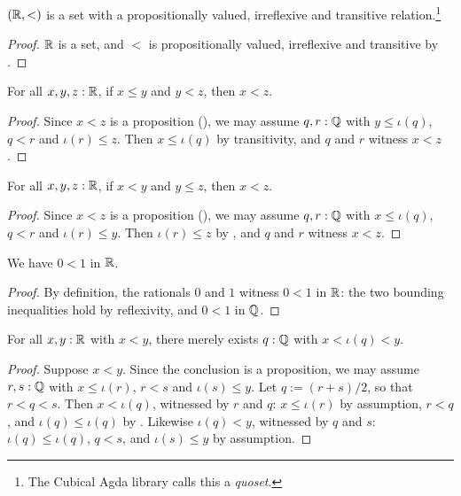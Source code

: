 \begin{corollary}
  \label{RLtQuoset}
  $(\mathbb{R}, <)$ is a set with a propositionally valued, irreflexive and transitive relation.\footnote{The Cubical Agda library calls this a \emph{quoset}.}
\end{corollary}
\begin{proof}
  $\mathbb{R}$ is a set, and $<$ is propositionally valued, irreflexive and transitive by .
\end{proof}

\begin{lemma}
  \label{isTransLeLtReal}
  For all $x, y, z : \mathbb{R}$, if $x \le y$ and $y < z$, then $x < z$.
\end{lemma}
\begin{proof}
  Since $x < z$ is a proposition (), we may assume $q, r : \mathbb{Q}$ with $y \le \iota(q)$, $q < r$ and $\iota(r) \le z$. Then $x \le \iota(q)$ by transitivity, and $q$ and $r$ witness $x < z$.
\end{proof}

\begin{lemma}
  \label{isTransLtLeReal}
  For all $x, y, z : \mathbb{R}$, if $x < y$ and $y \le z$, then $x < z$.
\end{lemma}
\begin{proof}
  Since $x < z$ is a proposition (), we may assume $q, r : \mathbb{Q}$ with $x \le \iota(q)$, $q < r$ and $\iota(r) \le y$. Then $\iota(r) \le z$ by , and $q$ and $r$ witness $x < z$.
\end{proof}

\begin{lemma}[\agda{0<1}]
  \label{zeroLtOneReal}
  We have $0 < 1$ in $\mathbb{R}$.
\end{lemma}
\begin{proof}
  By definition, the rationals $0$ and $1$ witness $0 < 1$ in $\mathbb{R}$: the two bounding inequalities hold by reflexivity, and $0 < 1$ in $\mathbb{Q}$.
\end{proof}

\begin{theorem}
  \label{isArchimedeanLtReal}
  For all $x, y : \mathbb{R}$ with $x < y$, there merely exists $q : \mathbb{Q}$ with $x < \iota(q) < y$.
\end{theorem}
\begin{proof}
  Suppose $x < y$. Since the conclusion is a proposition, we may assume $r, s : \mathbb{Q}$ with $x \le \iota(r)$, $r < s$ and $\iota(s) \le y$. Let $q := (r + s)/2$, so that $r < q < s$. Then $x < \iota(q)$, witnessed by $r$ and $q$: $x \le \iota(r)$ by assumption, $r < q$, and $\iota(q) \le \iota(q)$ by . Likewise $\iota(q) < y$, witnessed by $q$ and $s$: $\iota(q) \le \iota(q)$, $q < s$, and $\iota(s) \le y$ by assumption.
\end{proof}

